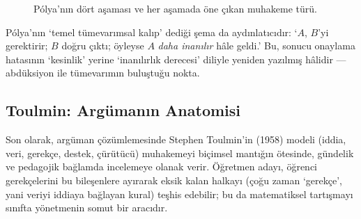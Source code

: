 \begin{figure}[h]
\centering
{}%
\caption{Pólya’nın dört aşaması ve her aşamada öne çıkan muhakeme türü.}
\end{figure}

Pólya’nın ‘temel tümevarımsal kalıp’ dediği şema da aydınlatıcıdır: ‘$A$, $B$’yi gerektirir; $B$ doğru çıktı; öyleyse $A$ \emph{daha inanılır} hâle geldi.’ Bu, sonucu onaylama hatasının ‘kesinlik’ yerine ‘inanılırlık derecesi’ diliyle yeniden yazılmış hâlidir — abdüksiyon ile tümevarımın buluştuğu nokta.

\subsection{Toulmin: Argümanın Anatomisi}

Son olarak, argüman çözümlemesinde Stephen Toulmin’in (1958) modeli (iddia, veri, gerekçe, destek, çürütücü) muhakemeyi biçimsel mantığın ötesinde, gündelik ve pedagojik bağlamda incelemeye olanak verir. Öğretmen adayı, öğrenci gerekçelerini bu bileşenlere ayırarak eksik kalan halkayı (çoğu zaman ‘gerekçe’, yani veriyi iddiaya bağlayan kural) teşhis edebilir; bu da matematiksel tartışmayı sınıfta yönetmenin somut bir aracıdır.

